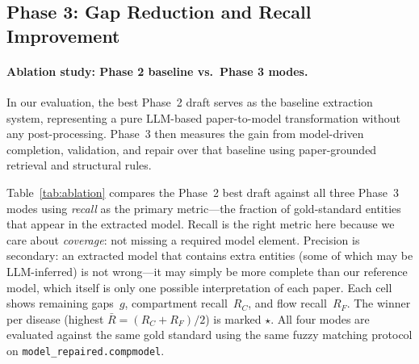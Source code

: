 \subsection{Phase 3: Gap Reduction and Recall Improvement}
\label{sec:phase3results}

\paragraph{Ablation study: Phase 2 baseline vs.\ Phase 3 modes.}
In our evaluation, the best Phase~2 draft serves as the baseline extraction system,
representing a pure LLM-based paper-to-model transformation without any post-processing.
Phase~3 then measures the gain from model-driven completion, validation, and repair
over that baseline using paper-grounded retrieval and structural rules.

Table~\ref{tab:ablation} compares the Phase~2 best draft against all three Phase~3
modes using \emph{recall} as the primary metric---the fraction of gold-standard
entities that appear in the extracted model.
Recall is the right metric here because we care about \emph{coverage}: not missing
a required model element. Precision is secondary: an extracted model that contains
extra entities (some of which may be LLM-inferred) is not wrong---it may simply be
more complete than our reference model, which itself is only one possible
interpretation of each paper.
Each cell shows remaining gaps~$g$, compartment recall~$R_C$, and flow recall~$R_F$.
The winner per disease (highest $\bar{R} = (R_C+R_F)/2$) is marked $\star$.
All four modes are evaluated against the same gold standard using the same fuzzy
matching protocol on \texttt{model\_repaired.compmodel}.

